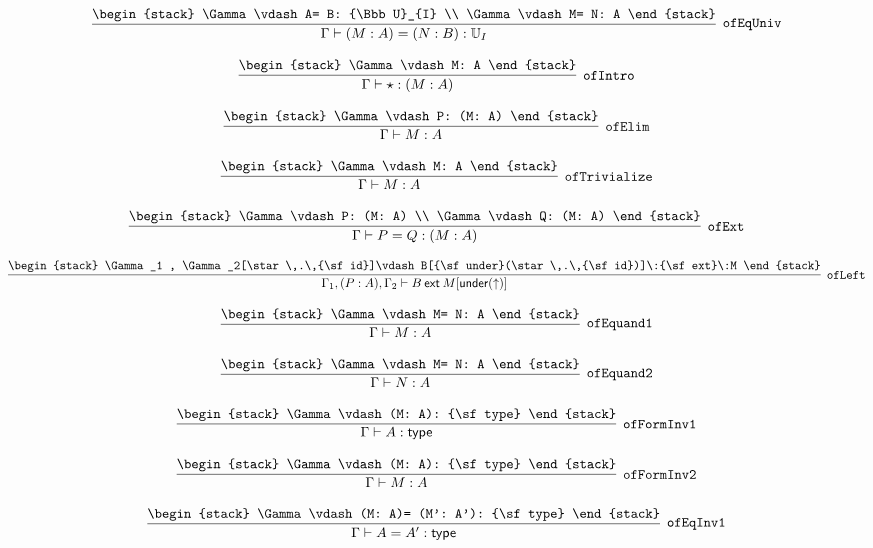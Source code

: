 \[
\infer[{\tt ofEqUniv}]{\Gamma \vdash (M: A)= (N: B): {\Bbb U}_{I}}{
\begin{stack}
\Gamma \vdash A= B: {\Bbb U}_{I}
\\
\Gamma \vdash M= N: A
\end{stack}}
\]

\[
\infer[{\tt ofIntro}]{\Gamma \vdash \star : (M: A)}{
\begin{stack}
\Gamma \vdash M: A
\end{stack}}
\]

\[
\infer[{\tt ofElim}]{\Gamma \vdash M: A}{
\begin{stack}
\Gamma \vdash P: (M: A)
\end{stack}}
\]

\[
\infer[{\tt ofTrivialize}]{\Gamma \vdash M: A}{
\begin{stack}
\Gamma \vdash M: A
\end{stack}}
\]

\[
\infer[{\tt ofExt}]{\Gamma \vdash P= Q: (M: A)}{
\begin{stack}
\Gamma \vdash P: (M: A)
\\
\Gamma \vdash Q: (M: A)
\end{stack}}
\]

\[
\infer[{\tt ofLeft}]{\Gamma_1 ,(P: A), \Gamma_2 \vdash B\:{\sf ext}\:M[{\sf under}(\uparrow )]}{
\begin{stack}
\Gamma_1 , \Gamma_2[\star \,.\,{\sf id}]\vdash B[{\sf under}(\star \,.\,{\sf id})]\:{\sf ext}\:M
\end{stack}}
\]

\[
\infer[{\tt ofEquand1}]{\Gamma \vdash M: A}{
\begin{stack}
\Gamma \vdash M= N: A
\end{stack}}
\]

\[
\infer[{\tt ofEquand2}]{\Gamma \vdash N: A}{
\begin{stack}
\Gamma \vdash M= N: A
\end{stack}}
\]

\[
\infer[{\tt ofFormInv1}]{\Gamma \vdash A: {\sf type}}{
\begin{stack}
\Gamma \vdash (M: A): {\sf type}
\end{stack}}
\]

\[
\infer[{\tt ofFormInv2}]{\Gamma \vdash M: A}{
\begin{stack}
\Gamma \vdash (M: A): {\sf type}
\end{stack}}
\]

\[
\infer[{\tt ofEqInv1}]{\Gamma \vdash A= A': {\sf type}}{
\begin{stack}
\Gamma \vdash (M: A)= (M': A'): {\sf type}
\end{stack}}
\]

